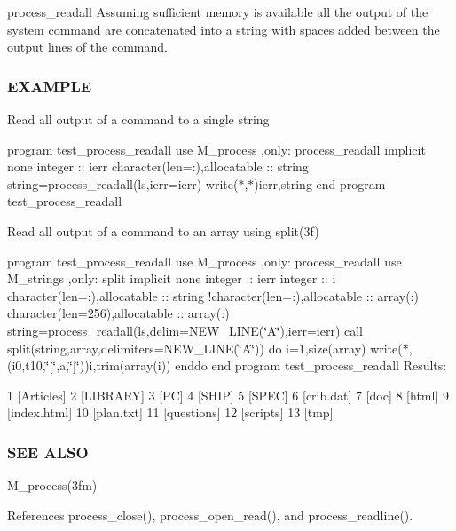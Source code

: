 process\+\_\+readall Assuming sufficient memory is available all the output of the system command are concatenated into a string with spaces added between the output lines of the command. \subsubsection*{E\+X\+A\+M\+P\+LE}

Read all output of a command to a single string

program test\+\_\+process\+\_\+readall use M\+\_\+process ,only\+: process\+\_\+readall implicit none integer \+:\+: ierr character(len=\+:),allocatable \+:\+: string string=process\+\_\+readall(\textquotesingle{}ls\textquotesingle{},ierr=ierr) write($\ast$,$\ast$)ierr,string end program test\+\_\+process\+\_\+readall

Read all output of a command to an array using split(3f)

program test\+\_\+process\+\_\+readall use M\+\_\+process ,only\+: process\+\_\+readall use M\+\_\+strings ,only\+: split implicit none integer \+:\+: ierr integer \+:\+: i character(len=\+:),allocatable \+:\+: string !character(len=\+:),allocatable \+:\+: array(\+:) character(len=256),allocatable \+:\+: array(\+:) string=process\+\_\+readall(\textquotesingle{}ls\textquotesingle{},delim=N\+E\+W\+\_\+\+L\+I\+NE(\char`\"{}\+A\char`\"{}),ierr=ierr) call split(string,array,delimiters=N\+E\+W\+\_\+\+L\+I\+NE(\char`\"{}\+A\char`\"{})) do i=1,size(array) write($\ast$,\textquotesingle{}(i0,t10,\char`\"{}\mbox{[}\char`\"{},a,\char`\"{}\mbox{]}\char`\"{})\textquotesingle{})i,trim(array(i)) enddo end program test\+\_\+process\+\_\+readall Results\+:

1 \mbox{[}Articles\mbox{]} 2 \mbox{[}L\+I\+B\+R\+A\+RY\mbox{]} 3 \mbox{[}PC\mbox{]} 4 \mbox{[}S\+H\+IP\mbox{]} 5 \mbox{[}S\+P\+EC\mbox{]} 6 \mbox{[}crib.\+dat\mbox{]} 7 \mbox{[}doc\mbox{]} 8 \mbox{[}html\mbox{]} 9 \mbox{[}index.\+html\mbox{]} 10 \mbox{[}plan.\+txt\mbox{]} 11 \mbox{[}questions\mbox{]} 12 \mbox{[}scripts\mbox{]} 13 \mbox{[}tmp\mbox{]}

\subsubsection*{S\+EE A\+L\+SO}

M\+\_\+process(3fm) 

References process\+\_\+close(), process\+\_\+open\+\_\+read(), and process\+\_\+readline().

